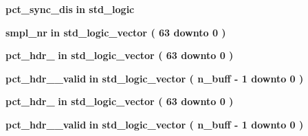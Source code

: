 \begin{DoxyCompactItemize}
\item 
{\bf pct\+\_\+sync\+\_\+dis}  {\bfseries {\bfseries \textcolor{keywordflow}{in}\textcolor{vhdlchar}{ }}} {\bfseries \textcolor{comment}{std\+\_\+logic}\textcolor{vhdlchar}{ }} 
\item 
{\bf smpl\+\_\+nr}  {\bfseries {\bfseries \textcolor{keywordflow}{in}\textcolor{vhdlchar}{ }}} {\bfseries \textcolor{comment}{std\+\_\+logic\+\_\+vector}\textcolor{vhdlchar}{ }\textcolor{vhdlchar}{(}\textcolor{vhdlchar}{ }\textcolor{vhdlchar}{ } \textcolor{vhdldigit}{63} \textcolor{vhdlchar}{ }\textcolor{keywordflow}{downto}\textcolor{vhdlchar}{ }\textcolor{vhdlchar}{ } \textcolor{vhdldigit}{0} \textcolor{vhdlchar}{ }\textcolor{vhdlchar}{)}\textcolor{vhdlchar}{ }} 
\item 
{\bf pct\+\_\+hdr\+\_}  {\bfseries {\bfseries \textcolor{keywordflow}{in}\textcolor{vhdlchar}{ }}} {\bfseries \textcolor{comment}{std\+\_\+logic\+\_\+vector}\textcolor{vhdlchar}{ }\textcolor{vhdlchar}{(}\textcolor{vhdlchar}{ }\textcolor{vhdlchar}{ } \textcolor{vhdldigit}{63} \textcolor{vhdlchar}{ }\textcolor{keywordflow}{downto}\textcolor{vhdlchar}{ }\textcolor{vhdlchar}{ } \textcolor{vhdldigit}{0} \textcolor{vhdlchar}{ }\textcolor{vhdlchar}{)}\textcolor{vhdlchar}{ }} 
\item 
{\bf pct\+\_\+hdr\+\_\+\_\+valid}  {\bfseries {\bfseries \textcolor{keywordflow}{in}\textcolor{vhdlchar}{ }}} {\bfseries \textcolor{comment}{std\+\_\+logic\+\_\+vector}\textcolor{vhdlchar}{ }\textcolor{vhdlchar}{(}\textcolor{vhdlchar}{ }\textcolor{vhdlchar}{ }\textcolor{vhdlchar}{ }\textcolor{vhdlchar}{ }{\bfseries {\bf n\+\_\+buff}} \textcolor{vhdlchar}{-\/}\textcolor{vhdlchar}{ } \textcolor{vhdldigit}{1} \textcolor{vhdlchar}{ }\textcolor{keywordflow}{downto}\textcolor{vhdlchar}{ }\textcolor{vhdlchar}{ } \textcolor{vhdldigit}{0} \textcolor{vhdlchar}{ }\textcolor{vhdlchar}{)}\textcolor{vhdlchar}{ }} 
\item 
{\bf pct\+\_\+hdr\+\_}  {\bfseries {\bfseries \textcolor{keywordflow}{in}\textcolor{vhdlchar}{ }}} {\bfseries \textcolor{comment}{std\+\_\+logic\+\_\+vector}\textcolor{vhdlchar}{ }\textcolor{vhdlchar}{(}\textcolor{vhdlchar}{ }\textcolor{vhdlchar}{ } \textcolor{vhdldigit}{63} \textcolor{vhdlchar}{ }\textcolor{keywordflow}{downto}\textcolor{vhdlchar}{ }\textcolor{vhdlchar}{ } \textcolor{vhdldigit}{0} \textcolor{vhdlchar}{ }\textcolor{vhdlchar}{)}\textcolor{vhdlchar}{ }} 
\item 
{\bf pct\+\_\+hdr\+\_\+\_\+valid}  {\bfseries {\bfseries \textcolor{keywordflow}{in}\textcolor{vhdlchar}{ }}} {\bfseries \textcolor{comment}{std\+\_\+logic\+\_\+vector}\textcolor{vhdlchar}{ }\textcolor{vhdlchar}{(}\textcolor{vhdlchar}{ }\textcolor{vhdlchar}{ }\textcolor{vhdlchar}{ }\textcolor{vhdlchar}{ }{\bfseries {\bf n\+\_\+buff}} \textcolor{vhdlchar}{-\/}\textcolor{vhdlchar}{ } \textcolor{vhdldigit}{1} \textcolor{vhdlchar}{ }\textcolor{keywordflow}{downto}\textcolor{vhdlchar}{ }\textcolor{vhdlchar}{ } \textcolor{vhdldigit}{0} \textcolor{vhdlchar}{ }\textcolor{vhdlchar}{)}\textcolor{vhdlchar}{ }} 

\end{DoxyCompactItemize}
